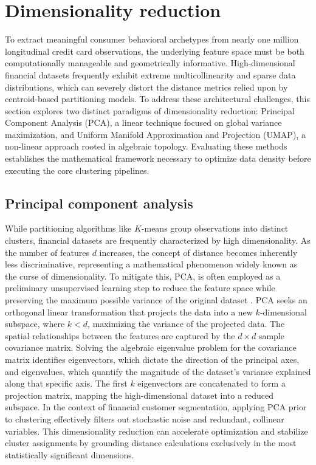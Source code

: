     \section{Dimensionality reduction}
    \label{sec:dimensionality_reduction}
    To extract meaningful consumer behavioral archetypes from nearly one million longitudinal credit card observations, the underlying feature space must be both computationally manageable and geometrically informative. High-dimensional financial datasets frequently exhibit extreme multicollinearity and sparse data distributions, which can severely distort the distance metrics relied upon by centroid-based partitioning models. To address these architectural challenges, this section explores two distinct paradigms of dimensionality reduction: Principal Component Analysis (PCA), a linear technique focused on global variance maximization, and Uniform Manifold Approximation and Projection (UMAP), a non-linear approach rooted in algebraic topology. Evaluating these methods establishes the mathematical framework necessary to optimize data density before executing the core clustering pipelines.
    
        \subsection{Principal component analysis}
        \label{subsec:pca}
        While partitioning algorithms like $K$-means group observations into distinct clusters, financial datasets are frequently characterized by high dimensionality.
        As the number of features $d$ increases, the concept of distance becomes inherently less discriminative, representing a mathematical phenomenon widely known as the curse of dimensionality.
        To mitigate this, PCA, is often employed as a preliminary unsupervised learning step to reduce the feature space while preserving the maximum possible variance of the original dataset \cite{naeem_unsupervised_2023}.
        PCA seeks an orthogonal linear transformation that projects the data into a new $k$-dimensional subspace, where $k < d$, maximizing the variance of the projected data.
        The spatial relationships between the features are captured by the $d \times d$ sample covariance matrix.
        Solving the algebraic eigenvalue problem for the covariance matrix identifies eigenvectors, which dictate the direction of the principal axes, and eigenvalues, which quantify the magnitude of the dataset's variance explained along that specific axis.
        The first $k$ eigenvectors are concatenated to form a projection matrix, mapping the high-dimensional dataset into a reduced subspace.
        In the context of financial customer segmentation, applying PCA prior to clustering effectively filters out stochastic noise and redundant, collinear variables.
        This dimensionality reduction can accelerate optimization and stabilize cluster assignments by grounding distance calculations exclusively in the most statistically significant dimensions.
        
